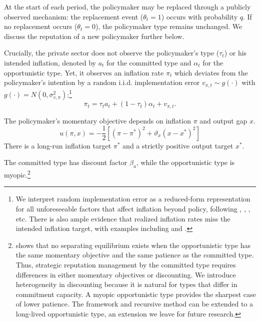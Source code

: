 \documentclass[12pt,letter,leqno]{article}
\theoremstyle{asn}
\theoremstyle{lem}
\theoremstyle{slem}
\theoremstyle{prop}
\theoremstyle{appprop}
\theoremstyle{rem}
\theoremstyle{defn}
\begin{document}
At the start of each period, the policymaker may be replaced through a publicly observed mechanism: the replacement event ($\theta_t=1$) occurs with probability $q$. If no replacement occurs ($\theta_t=0$), the policymaker type remains unchanged. We discuss the reputation of a new policymaker further below. 

Crucially, the private sector does not observe the policymaker's type ($\tau_t$) or his intended
inflation, denoted by $a_{t}$ for the committed type and $\alpha_{t}$ for the opportunistic type. Yet, it observes an inflation rate $\pi_t$ which 
deviates from the policymaker's intention by a random i.i.d. implementation error $v_{\pi,t} \sim g(\cdot)$ with $g(\cdot) = N(0,\sigma_{v,\pi}^2)$:\footnote{We interpret random implementation error as a
reduced-form representation for all unforeseeable factors that affect
inflation beyond policy, following \cite{cukierman_theory_1986}, \cite{faust_transparency_2001}, \cite{atkeson_advantage_2006}, etc. There is also
ample evidence that realized inflation rates miss the intended inflation
target, with examples including \cite{roger_target_2005} and \cite{mishkin_does_2007}.} 
\begin{equation}\label{eq:pi}
    \pi_t=\tau_t a_t + (1-\tau_t) \alpha_t + v_{\pi,t}.
\end{equation}

The policymaker's momentary objective depends on inflation $\pi $ and output gap $x$.%
\begin{equation}
u\left( \pi ,x \right) =-\frac{1}{2}[(\pi -\pi^*)^{2}+\vartheta
_{x}(x-x^{\ast })^{2}]  \label{OBJ}
\end{equation}%
There is a long-run inflation target $\pi ^{\ast }$ and
a strictly positive output target $x^{\ast }$.


The committed type has discount factor $\beta_a$, while the opportunistic type
is myopic.\footnote{\cite{lu_optimal_2013} shows that no separating equilibrium
exists when the opportunistic type has the same momentary objective and the same
patience as the committed type. Thus, strategic reputation management by the
committed type requires differences in either momentary objectives or
discounting. We introduce heterogeneity in discounting because it is natural for
types that differ in commitment capacity. A myopic opportunistic type provides
the sharpest case of lower patience. The framework and recursive method can be
extended to a long-lived opportunistic type, an extension we leave for future
research.}
\end{document}
